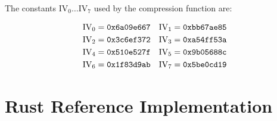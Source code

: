 \documentclass[11pt,notitlepage,a4paper]{article}
\newcommand{\IV}{\text{IV}}
\begin{document}
\begin{appendices}
The constants $\IV_0 \ldots \IV_7$ used by the compression function are:

\begin{align*}
    \IV_0 &= \text{\texttt{0x6a09e667}} &
    \IV_1 &= \text{\texttt{0xbb67ae85}} \\
    \IV_2 &= \text{\texttt{0x3c6ef372}} &
    \IV_3 &= \text{\texttt{0xa54ff53a}} \\
    \IV_4 &= \text{\texttt{0x510e527f}} &
    \IV_5 &= \text{\texttt{0x9b05688c}} \\
    \IV_6 &= \text{\texttt{0x1f83d9ab}} &
    \IV_7 &= \text{\texttt{0x5be0cd19}}
\end{align*}

\section{Rust Reference Implementation}\label{sec:referenceimpl}

\inputminted{rust}{reference_impl.rs}

\end{appendices}
\end{document}

